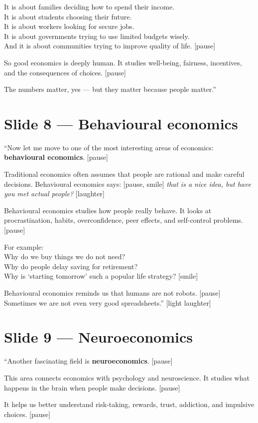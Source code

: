 \documentclass[12pt]{article}
\begin{document}
It is about families deciding how to spend their income.\\
It is about students choosing their future.\\
It is about workers looking for secure jobs.\\
It is about governments trying to use limited budgets wisely.\\
And it is about communities trying to improve quality of life. [pause]

So good economics is deeply human. It studies well-being, fairness, incentives, and the consequences of choices. [pause]

The numbers matter, yes --- but they matter because people matter.''

\section*{Slide 8 --- Behavioural economics}

``Now let me move to one of the most interesting areas of economics: \textbf{behavioural economics}. [pause]

Traditional economics often assumes that people are rational and make careful decisions. Behavioural economics says: [pause, smile] \textit{that is a nice idea, but have you met actual people?} [laughter]

Behavioural economics studies how people really behave. It looks at procrastination, habits, overconfidence, peer effects, and self-control problems. [pause]

For example:\\
Why do we buy things we do not need?\\
Why do people delay saving for retirement?\\
Why is `starting tomorrow' such a popular life strategy? [smile]

Behavioural economics reminds us that humans are not robots. [pause] Sometimes we are not even very good spreadsheets.'' [light laughter]
\newpage
\section*{Slide 9 --- Neuroeconomics}

``Another fascinating field is \textbf{neuroeconomics}. [pause]

This area connects economics with psychology and neuroscience. It studies what happens in the brain when people make decisions. [pause]

It helps us better understand risk-taking, rewards, trust, addiction, and impulsive choices. [pause]
\end{document}
